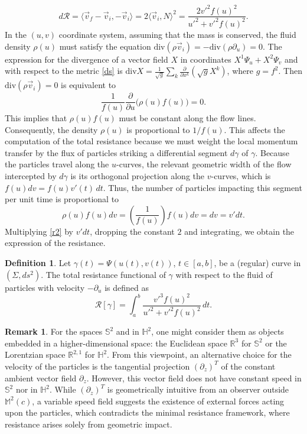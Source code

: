 \documentclass[a4paper,12pt]{amsart}
\theoremstyle{definition}
\newtheorem{definition}[theorem]{Definition}
\newtheorem{remark}[theorem]{Remark}
\def\r{\mathbb R}
\def\h{\mathbb H}
\def\m{\mathbb M}
\def\R{\mathcal{ R}}
\def\s{\mathbb S}
\begin{document}
\begin{equation}\label{r2}
d\R = \langle \vec{v}_f - \vec{v}_i, -\vec{v}_i \rangle = 2\langle \vec{v}_i, N \rangle^2= \frac{2v'^2f(u)^2}{u'^2 +v'^2 f(u)^2}.
\end{equation}
In the   $(u,v)$ coordinate system, assuming that the mass is conserved, the fluid density $\rho(u)$ must 
satisfy the equation $\text{div}(\rho \vec{v}_i)=-\text{div}(\rho\partial_u) = 0$. The expression for the divergence of a vector field $X$ in coordinates $X^1\Psi_u+X^2\Psi_v$ and with respect to the metric \eqref{ds} is 
 $\text{div} X = \frac{1}{\sqrt{g}} \sum_k \frac{\partial}{\partial x^k} \left( \sqrt{g} X^k \right)$, where $g=f^2$. Then $\text{div}(\rho \vec{v}_i)=0$ is equivalent to 
$$\frac{1}{f(u)} \frac{\partial}{\partial u} \big(\rho(u) f(u)\big) = 0.$$
This implies that $\rho(u) f(u)$ 
must be constant along the flow lines. Consequently, the density $\rho(u)$ is proportional to 
$ 1/f(u)$. This affects   the computation of  the total resistance because we must weight the local momentum transfer by the flux of particles 
 striking a differential 
 segment $d\gamma$ of $\gamma$. Because the particles travel along the $u$-curves, 
 the relevant geometric width of the flow intercepted by $d\gamma$ is its orthogonal 
 projection along the $v$-curves, 
 which is $f(u) dv=f(u)v'(t)\, dt$. Thus, the number of particles 
 impacting this segment per unit time is proportional to 
 $$ \rho(u) f(u) dv =\left( \frac{1}{f(u)} \right) f(u) dv = dv = v' dt.$$ 
 Multiplying \eqref{r2} by $v' dt$, dropping the constant $2$ and integrating, 
 we obtain the expression of the resistance.
 
 
\begin{definition}
 Let $\gamma(t) = \Psi(u(t), v(t))$, $t \in [a,b]$, be a (regular) curve in $(\Sigma,ds^2)$. The total resistance 
 functional of $\gamma$ with respect to the fluid of particles with velocity $-\partial_u$ is defined as
\begin{equation}\label{r1}
\R[\gamma] = \int_a^b \frac{v'^3 f(u)^2}{u'^2 +v'^2 f(u)^2} \, dt.
\end{equation}
\end{definition}
 
 
 \begin{remark} For the spaces  $\s^2 $ and in $\h^2$, one might consider them as   objects embedded in a higher-dimensional space: the Euclidean space $\r^3$ for $\s^2$ or the Lorentzian space $\r^{2,1}$ for $\h^2$. From this viewpoint, an alternative choice for the   velocity of the particles is the tangential projection $(\partial _z)^T$ of the constant ambient vector field $\partial_z$. However, this vector field does not have constant speed in $\s^2$ nor in $\h^2$. While $(\partial _z)^T$ is geometrically intuitive from an observer outside $\m^2(c)$, a variable speed field 
suggests the existence of external forces acting upon the particles, which 
contradicts the minimal resistance framework, where resistance arises solely from geometric impact. 
\end{remark}
 
\end{document}
